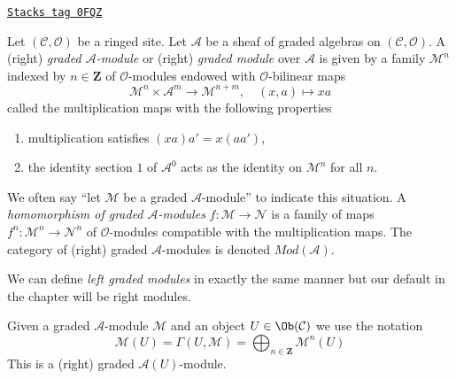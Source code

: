 \begin{definition}[Gm]
\label{sdga-definition-gm}
\href{https://stacks.math.columbia.edu/tag/0FQZ}{\texttt{Stacks tag 0FQZ}}

Let $(\mathcal{C}, \mathcal{O})$ be a ringed site.
Let $\mathcal{A}$ be a sheaf of graded algebras
on $(\mathcal{C}, \mathcal{O})$.
A (right) {\it graded $\mathcal{A}$-module} or (right)
{\it graded module} over $\mathcal{A}$
is given by a family $\mathcal{M}^n$ indexed by $n \in \mathbf{Z}$
of $\mathcal{O}$-modules endowed with
$\mathcal{O}$-bilinear maps
$$
\mathcal{M}^n \times \mathcal{A}^m \to \mathcal{M}^{n + m},\quad
(x, a) \longmapsto xa
$$
called the multiplication maps with the following properties
\begin{enumerate}
\item multiplication satisfies $(xa)a' = x(aa')$,
\item the identity section $1$ of $\mathcal{A}^0$
acts as the identity on $\mathcal{M}^n$ for all $n$.
\end{enumerate}
We often say ``let $\mathcal{M}$ be a graded $\mathcal{A}$-module''
to indicate this situation.
A {\it homomorphism of graded $\mathcal{A}$-modules}
$f : \mathcal{M} \to \mathcal{N}$ is a family of maps
$f^n : \mathcal{M}^n \to \mathcal{N}^n$
of $\mathcal{O}$-modules compatible with the multiplication maps.
The category of (right) graded $\mathcal{A}$-modules
is denoted $\textit{Mod}(\mathcal{A})$.
\end{definition}

We can define {\it left graded modules} in exactly the same manner
but our default in the chapter will be right modules.

\medskip\noindent
Given a graded $\mathcal{A}$-module $\mathcal{M}$
and an object $U \in \Ob(\mathcal{C})$ we use the notation
$$
\mathcal{M}(U) =
\Gamma(U, \mathcal{M}) =
\bigoplus\nolimits_{n \in \mathbf{Z}} \mathcal{M}^n(U)
$$
This is a (right) graded $\mathcal{A}(U)$-module.

